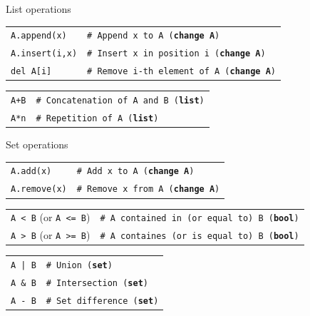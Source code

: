 \documentclass[11pt]{beamer}
\begin{document}
\begin{frame}{List operations}
  \begin{tabular}{ll}
    \texttt{A.append(x)} & \texttt{\# Append x to A ({\bf change A})} \\
    \texttt{A.insert(i,x)} &
    \texttt{\# Insert x in position i ({\bf change A})} \\
    \texttt{del A[i]} & \texttt{\# Remove i-th element of A ({\bf change A})}\\
  \end{tabular}

  \vspace{1cm}
  \begin{tabular}{ll}
    \texttt{A+B} & \texttt{\# Concatenation of A and B ({\bf list})} \\
    \texttt{A*n} & \texttt{\# Repetition of A ({\bf list})} \\
  \end{tabular}
\end{frame}

\begin{frame}{Set operations}
  \begin{tabular}{ll}
    \texttt{A.add(x)} & \texttt{\# Add x to A ({\bf change A})} \\
    \texttt{A.remove(x)} & \texttt{\# Remove x from A ({\bf change A})}\\
  \end{tabular}

  \vspace{0.5cm}
  \begin{tabular}{ll}
    \texttt{A < B} (or \texttt{A <= B}) &
    \texttt{\# A contained in (or equal to) B ({\bf bool})} \\
    \texttt{A > B} (or \texttt{A >= B}) &
    \texttt{\# A containes (or is equal to) B ({\bf bool})} \\
  \end{tabular}

  \vspace{0.5cm}
  \begin{tabular}{ll}
    \texttt{A | B} & \texttt{\# Union ({\bf set})} \\
    \texttt{A \& B} & \texttt{\# Intersection ({\bf set})}\\
    \texttt{A - B} & \texttt{\# Set difference ({\bf set})} \\
  \end{tabular}
\end{frame}
\end{document}
